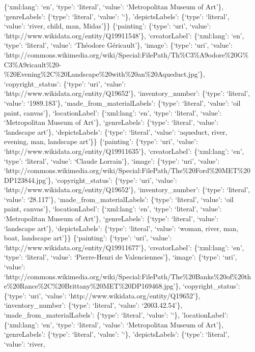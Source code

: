 \documentclass[
  letterpaper,
  DIV=11,
  numbers=noendperiod]{scrreprt}
\begin{document}
\{`xml:lang': `en', `type': `literal', `value': `Metropolitan Museum of
Art'\}, `genreLabels': \{`type': `literal', `value': '`\},
'depictsLabels': \{`type': `literal', `value': `river, child, man,
Midas'\}\} \{`painting': \{`type': `uri', `value':
`http://www.wikidata.org/entity/Q19911548'\}, `creatorLabel':
\{`xml:lang': `en', `type': `literal', `value': `Théodore Géricault'\},
`image': \{`type': `uri', `value':
`http://commons.wikimedia.org/wiki/Special:FilePath/Th\%C3\%A9odore\%20G\%C3\%A9ricault\%20-\%20Evening\%2C\%20Landscape\%20with\%20an\%20Aqueduct.jpg'\},
`copyright\_status': \{`type': `uri', `value':
`http://www.wikidata.org/entity/Q19652'\}, `inventory\_number':
\{`type': `literal', `value': `1989.183'\},
`made\_from\_materialLabels': \{`type': `literal', `value': `oil paint,
canvas'\}, `locationLabel': \{`xml:lang': `en', `type': `literal',
`value': `Metropolitan Museum of Art'\}, `genreLabels': \{`type':
`literal', `value': `landscape art'\}, `depictsLabels': \{`type':
`literal', `value': `aqueduct, river, evening, man, landscape art'\}\}
\{`painting': \{`type': `uri', `value':
`http://www.wikidata.org/entity/Q19911635'\}, `creatorLabel':
\{`xml:lang': `en', `type': `literal', `value': `Claude Lorrain'\},
`image': \{`type': `uri', `value':
`http://commons.wikimedia.org/wiki/Special:FilePath/The\%20Ford\%20MET\%20DP123844.jpg'\},
`copyright\_status': \{`type': `uri', `value':
`http://www.wikidata.org/entity/Q19652'\}, `inventory\_number':
\{`type': `literal', `value': `28.117'\}, `made\_from\_materialLabels':
\{`type': `literal', `value': `oil paint, canvas'\}, `locationLabel':
\{`xml:lang': `en', `type': `literal', `value': `Metropolitan Museum of
Art'\}, `genreLabels': \{`type': `literal', `value': `landscape art'\},
`depictsLabels': \{`type': `literal', `value': `woman, river, man, boat,
landscape art'\}\} \{`painting': \{`type': `uri', `value':
`http://www.wikidata.org/entity/Q19911677'\}, `creatorLabel':
\{`xml:lang': `en', `type': `literal', `value': `Pierre-Henri de
Valenciennes'\}, `image': \{`type': `uri', `value':
`http://commons.wikimedia.org/wiki/Special:FilePath/The\%20Banks\%20of\%20the\%20Rance\%2C\%20Brittany\%20MET\%20DP169468.jpg'\},
`copyright\_status': \{`type': `uri', `value':
`http://www.wikidata.org/entity/Q19652'\}, `inventory\_number':
\{`type': `literal', `value': `2003.42.54'\},
`made\_from\_materialLabels': \{`type': `literal', `value': '`\},
'locationLabel': \{`xml:lang': `en', `type': `literal', `value':
`Metropolitan Museum of Art'\}, `genreLabels': \{`type': `literal',
`value': '`\}, 'depictsLabels': \{`type': `literal', `value': `river,
\end{document}
